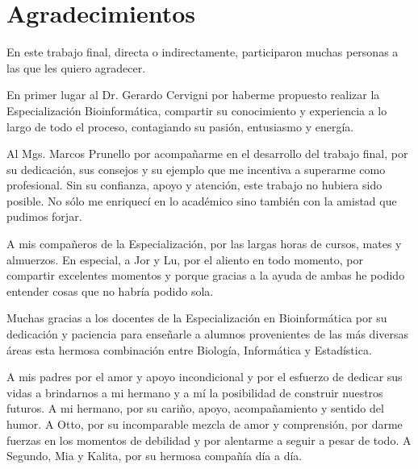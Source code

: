 
\chapter*{Agradecimientos}


En este trabajo final, directa o indirectamente, participaron muchas personas a las que les quiero agradecer.

En primer lugar al Dr. Gerardo Cervigni por haberme propuesto realizar la Especialización Bioinformática, compartir su conocimiento y experiencia a lo largo de todo el proceso, contagiando su pasión, entusiasmo y energía. 

Al Mgs. Marcos Prunello por acompañarme en el desarrollo del trabajo final, por su dedicación, sus consejos y su ejemplo que me incentiva a superarme como profesional. Sin su confianza, apoyo y atención, este trabajo no hubiera sido posible. No sólo me enriquecí en lo académico sino también con la amistad que pudimos forjar. 

A mis compañeros de la Especialización, por las largas horas de cursos, mates y almuerzos. En especial, a Jor y Lu, por el aliento en todo momento, por compartir excelentes momentos y porque gracias a la ayuda de ambas he podido entender cosas que no habría podido sola.

Muchas gracias a los docentes de la Especialización en Bioinformática por su dedicación y paciencia para enseñarle a alumnos provenientes de las más diversas áreas esta hermosa combinación entre Biología, Informática y Estadística.

A mis padres por el amor y apoyo incondicional y por el esfuerzo  de  dedicar  sus  vidas  a  brindarnos  a mi hermano y a mí la  posibilidad  de construir nuestros futuros. A mi hermano, por su cariño, apoyo, acompañamiento y sentido del humor. A Otto, por su incomparable mezcla de amor y comprensión, por darme fuerzas en los momentos de debilidad y por alentarme a seguir a pesar de todo. A Segundo, Mia y Kalita, por su hermosa compañía día a día.

